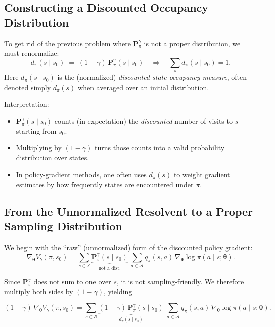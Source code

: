\subsection{Constructing a Discounted Occupancy Distribution}

To get rid of the previous problem where $\mathbf{P}_\pi^{\gamma}$ is not a proper distribution, we must renormalize:
\[
d_{\pi}(s\mid s_{0})
\;=\;
(1-\gamma)\,\mathbf{P}_\pi^{\gamma}(s\mid s_{0})
\quad\Longrightarrow\quad
\sum_{s}d_{\pi}(s\mid s_{0})=1.
\]
Here \(d_{\pi}(s\mid s_{0})\) is the (normalized) \emph{discounted state‐occupancy measure}, often denoted simply \(d_{\pi}(s)\) when averaged over an initial distribution.

Interpretation:

\begin{itemize}
  \item \(\mathbf{P}_\pi^{\gamma}(s\mid s_{0})\) counts (in expectation) the \emph{discounted} number of visits to \(s\) starting from \(s_{0}\).
  \item Multiplying by \((1-\gamma)\) turns those counts into a valid probability distribution over states.
  \item In policy‐gradient methods, one often uses \(d_{\pi}(s)\) to weight gradient estimates by how frequently states are encountered under \(\pi\). 
\end{itemize}

\subsection{From the Unnormalized Resolvent to a Proper Sampling Distribution}

We begin with the “raw” (unnormalized) form of the discounted policy gradient:
\[
\nabla_{\boldsymbol{\theta}}V_{\gamma}(\pi, s_{0})
=\sum_{s\in\mathcal{S}}
\underbrace{\mathbf{P}_\pi^{\gamma}(s\mid s_{0})}_{\text{not a dist.}}
\;\sum_{a\in\mathcal{A}}
q_{\pi}(s,a)\,
\nabla_{\boldsymbol{\theta}}\log\pi(a\mid s;\boldsymbol{\theta}).
\]

Since \(\mathbf{P}_\pi^{\gamma}\) does not sum to one over \(s\), it is not sampling‐friendly.  We therefore multiply both sides by \((1-\gamma)\), yielding

\[
(1-\gamma)\,
\nabla_{\boldsymbol{\theta}}V_{\gamma}(\pi, s_{0})
=
\sum_{s\in\mathcal{S}}
\underbrace{(1-\gamma)\,\mathbf{P}_\pi^{\gamma}(s\mid s_{0})}_{d_{\pi}(s\mid s_{0})}
\;\sum_{a\in\mathcal{A}}
q_{\pi}(s,a)\,
\nabla_{\boldsymbol{\theta}}\log\pi(a\mid s;\boldsymbol{\theta}).
\]

